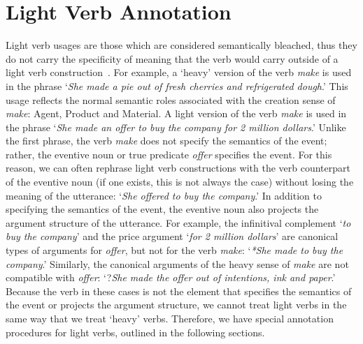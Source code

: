 \documentclass[11pt]{report}
\begin{document}
\chapter{Light Verb Annotation}
\label{ch: LVC}
Light verb usages are those which are considered semantically bleached, thus they do not carry the specificity of meaning that the verb would carry outside of a light verb construction~\cite{butt-93}.  For example, a `heavy' version of the verb \textit{make} is used in the phrase `\textit{She made a pie out of fresh cherries and refrigerated dough}.'  This usage reflects the normal semantic roles associated with the creation sense of \textit{make}: Agent, Product and Material.  A light version of the verb \textit{make} is used in the phrase `\textit{She made an offer to buy the company for 2 million dollars}.'  Unlike the first phrase, the verb \textit{make} does not specify the semantics of the event; rather, the eventive noun or true predicate \textit{offer} specifies the event.  For this reason, we can often rephrase light verb constructions with the verb counterpart of the eventive noun (if one exists, this is not always the case) without losing the meaning of the utterance: `\textit{She offered to buy the company}.'  In addition to specifying the semantics of the event, the eventive noun also projects the argument structure of the utterance.  For example, the infinitival complement `\textit{to buy the company}' and the price argument `\textit{for 2 million dollars}' are canonical types of arguments for \textit{offer}, but not for the verb \textit{make}: `\textit{\**She made to buy the company}.'  Similarly, the canonical arguments of the heavy sense of \textit{make} are not compatible with \textit{offer}: `?\textit{She made the offer out of intentions, ink and paper}.' Because the verb in these cases is not the element that specifies the semantics of the event or projects the argument structure, we cannot treat light verbs in the same way that we treat `heavy' verbs.  Therefore, we have special annotation procedures for light verbs, outlined in the following sections. 
\end{document}
